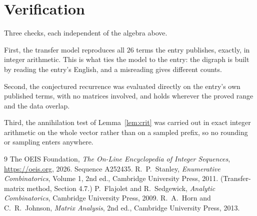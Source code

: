 \documentclass[11pt,a4paper]{article}
\theoremstyle{plain}
\theoremstyle{definition}
\begin{document}
\section{Verification}

Three checks, each independent of the algebra above.

First, the transfer model reproduces all $26$ terms the entry publishes, exactly, in
integer arithmetic. This is what ties the model to the entry: the digraph is built by reading
the entry's English, and a misreading gives different counts.

Second, the conjectured recurrence was evaluated directly on the entry's own published terms,
with no matrices involved, and holds wherever the proved range and the data overlap.

Third, the annihilation test of Lemma~\ref{lem:crit} was carried out in exact integer
arithmetic on the whole vector rather than on a sampled prefix, so no rounding or sampling
enters anywhere.

\begin{thebibliography}{9}
 The OEIS Foundation, \emph{The On-Line Encyclopedia of Integer
Sequences}, \url{https://oeis.org}, 2026. Sequence A252435.
 R.~P.~Stanley, \emph{Enumerative Combinatorics}, Volume 1, 2nd ed.,
Cambridge University Press, 2011. (Transfer-matrix method, Section 4.7.)
 P.~Flajolet and R.~Sedgewick, \emph{Analytic Combinatorics}, Cambridge
University Press, 2009.
 R.~A.~Horn and C.~R.~Johnson, \emph{Matrix Analysis}, 2nd ed., Cambridge
University Press, 2013.
\end{thebibliography}
\end{document}
